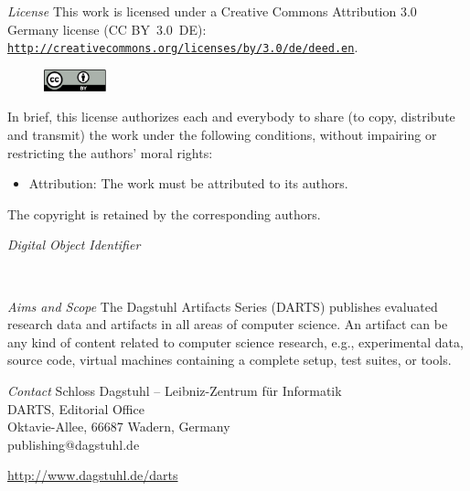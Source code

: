\documentclass[a4paper,UKenglish]{dartsmaster-v2019}
\begin{document}
\begin{publicationinfo}
\emph{License}\newline
This work is licensed under a Creative Commons Attribution 3.0 Germany license (CC BY~3.0~DE): \href{http://creativecommons.org/licenses/by/3.0/de/deed.en}{\nolinkurl{http://creativecommons.org/licenses/by/}}\linebreak \href{http://creativecommons.org/licenses/by/3.0/de/deed.en}{\nolinkurl{3.0/de/deed.en}}.
\begin{figure}
\vspace*{-1\baselineskip}
\includegraphics[width=1.8cm]{cc-by}
\end{figure} 
In brief, this license authorizes each and everybody to share (to
copy, distribute and transmit) the work under the following
conditions, without impairing or restricting the authors'
moral rights:
\begin{itemize}
\item Attribution: The work must be attributed to its authors.
\end{itemize}

The copyright is retained by the corresponding authors.

\vfill
\emph{Digital Object Identifier}\newline
\printForewordDOI

\newpage

~~

\bigskip

\emph{Aims and Scope}\newline
The Dagstuhl Artifacts Series (DARTS) publishes evaluated research data and artifacts in all areas of computer science. An artifact can be any kind of content related to computer science research, e.g., experimental data, source code, virtual machines containing a complete setup, test suites, or tools.



\vfill


\bigskip
\emph{Contact}\newline
Schloss Dagstuhl -- Leibniz-Zentrum f\"ur Informatik\\
DARTS, Editorial Office\\
Oktavie-Allee, 66687 Wadern, Germany\\ 
publishing@dagstuhl.de


\bigskip

\url{http://www.dagstuhl.de/darts}
 
 \thispagestyle{empty}
 \onecolumn

\newpage

\end{publicationinfo}
\end{document}
